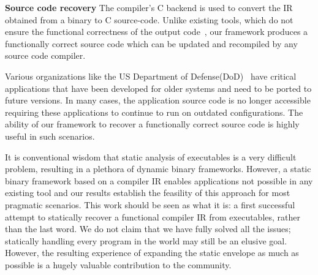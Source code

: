 

\item \textbf{Source code recovery}
The compiler's C backend is used to convert the IR obtained from a binary to C source-code. Unlike existing tools, which do not ensure the functional correctness of the output code~\cite{boomerang, hex-rays}, our framework produces a functionally correct source code which can be updated and recompiled by any source code compiler.

Various organizations like the US Department of Defense(DoD)~\cite{DARPA-BET1} have  critical applications that have been developed for older systems and need to be ported to future versions. In many cases, the application source code is no longer accessible requiring these applications to continue to run on outdated configurations. The ability of our framework to recover a functionally correct source code is highly useful in such scenarios.

\squishend

It is conventional wisdom that static analysis of executables is a very difficult problem, resulting in a plethora of dynamic binary frameworks. However, a static binary framework based on a compiler IR enables applications not possible in any existing tool and our results establish the feasility of this approach for most pragmatic scenarios. This work should be seen as what it is: a first successful attempt to statically recover a functional compiler IR from executables, rather than the last word. We do not claim that we have fully solved all the issues; statically handling every program in the world may still be an elusive goal. However, the resulting experience of expanding the static envelope as much as possible is a hugely valuable contribution to the community.

